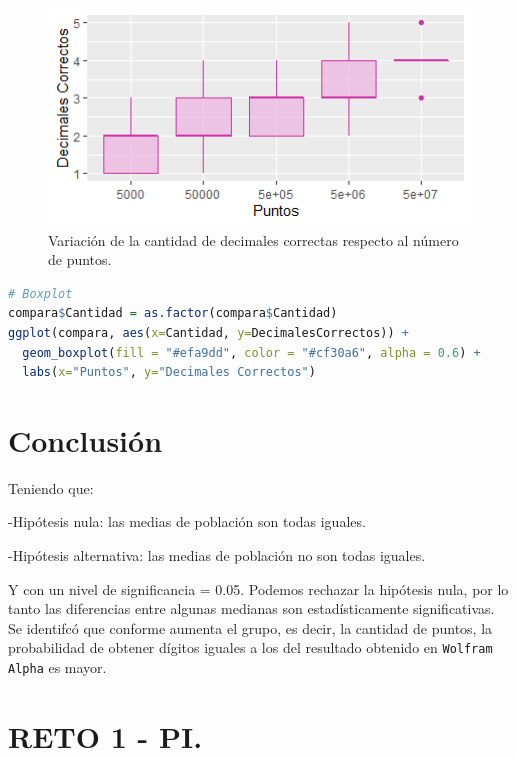 \documentclass{article}
\begin{document}
\begin{figure}[h!] %
    \centering
    \includegraphics[width=150mm]{boxplothw5.png} %
    \caption{Variaci\'on de la cantidad de decimales correctas respecto al n\'umero de puntos.}
    \label{Figura 1}
\end{figure}

\begin{lstlisting}[language=R, caption= C\'odigo data frame \texttt{compara}.]
# Boxplot
compara$Cantidad = as.factor(compara$Cantidad)
ggplot(compara, aes(x=Cantidad, y=DecimalesCorrectos)) +
  geom_boxplot(fill = "#efa9dd", color = "#cf30a6", alpha = 0.6) +
  labs(x="Puntos", y="Decimales Correctos") 
\end{lstlisting}




\section{Conclusi\'on}

Teniendo que:

-Hip\'otesis nula: las medias de poblaci\'on son todas iguales.

-Hip\'otesis alternativa: las medias de poblaci\'on no son todas iguales.

Y con un nivel de significancia = 0.05. Podemos rechazar la hip\'otesis nula, por lo tanto las diferencias entre algunas medianas son estad\'isticamente significativas.
Se identifc\'o que conforme aumenta el grupo, es decir, la cantidad de puntos, la probabilidad de obtener dígitos iguales a los del resultado obtenido en \texttt{Wolfram Alpha} es mayor.





\newpage
\section{RETO 1 - PI.}
\end{document}
